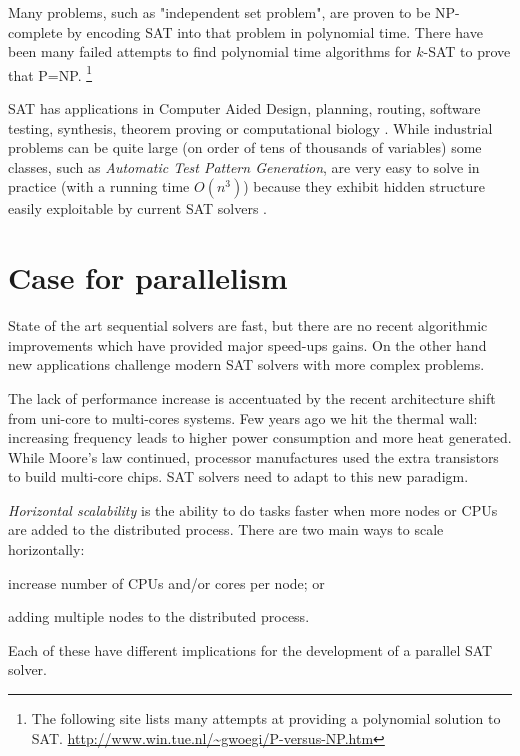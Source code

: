 Many problems, such as "independent set problem", are proven to be
NP-complete by encoding SAT into that problem in polynomial time.
There have been many failed attempts to find polynomial time
algorithms for $k$-SAT to prove that P=NP.  \footnote{The following
site lists many attempts at providing a polynomial solution to
SAT. \url{http://www.win.tue.nl/~gwoegi/P-versus-NP.htm}}

SAT has applications in Computer Aided Design,
planning, routing, software testing, synthesis, theorem
proving or computational biology \cite{Smith_diagnosis,
Soeken:2010:VUM:1870926.1871248, demoura2008z3, Corblin07asat-based,
Kautz:1992:PS:145448.146725}. While industrial problems can be quite
large (on order of tens of thousands of variables) some classes,
such as \emph{Automatic Test Pattern Generation}, are very easy
to solve in practice (with a running time $O(n^3)$) because they
exhibit hidden structure easily exploitable by current SAT solvers
\cite{Prasad:1999:WAE:309847.309857}.



\section{Case for parallelism}

State of the art sequential solvers are fast, but there are no
recent algorithmic improvements which have provided major speed-ups
gains. On the other hand new applications challenge modern SAT
solvers with more complex problems.

The lack of performance increase is accentuated by the recent
architecture shift from uni-core to multi-cores systems. Few
years ago we hit the thermal wall: increasing frequency leads to
higher power consumption and more heat generated. While Moore's law
continued, processor manufactures used the extra transistors to build
multi-core chips.  SAT solvers need to adapt to this new paradigm.

\emph{Horizontal scalability} is the ability to do tasks faster
when more nodes or CPUs are added to the distributed process. There
are two main ways to scale horizontally:
\begin{inparaenum}[a)]
  \item increase number of CPUs and/or cores per node; or
  \item adding multiple nodes to the distributed process.
\end{inparaenum} Each of these have different implications
for the development of a parallel SAT solver.

